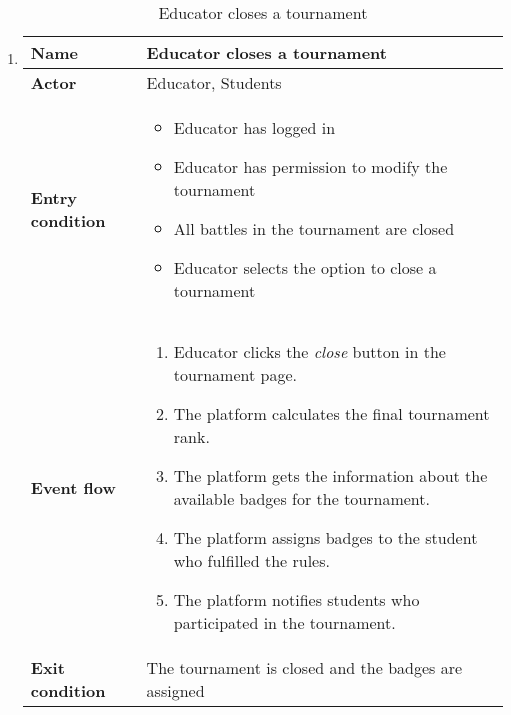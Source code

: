 \begin{enumerate}[label=\textbf{UC\arabic*}:,leftmargin=1.3cm]
      \item \textbf{}
            \begin{table}[H]
                  \centering
                  \begin{tabular}{|l|p{11.9cm}|}
                        \hline
                        \textbf{Name}            & Educator closes a tournament                               \\\hline
                        \textbf{Actor}           & Educator, Students                                         \\\hline
                        \textbf{Entry condition} &
                        \begin{itemize}
                              \item Educator has logged in
                              \item Educator has permission to modify the tournament
                              \item All battles in the tournament are closed
                              \item Educator selects the option to close a tournament
                        \end{itemize}                                \\\hline
                        \textbf{Event flow}      &
                        \begin{enumerate}[label=\arabic*.]
                              \item Educator clicks the \emph{close} button in the tournament page.
                              \item The platform calculates the final tournament rank.
                              \item The platform gets the information about the available badges for the tournament.
                              \item The platform assigns badges to the student who fulfilled the rules.
                              \item The platform notifies students who participated in the tournament.
                        \end{enumerate} \\\hline
                        \textbf{Exit condition}  & The tournament is closed and the badges are assigned       \\\hline
                  \end{tabular}
                  \caption{Educator closes a tournament   }
                  \label{table:Educator closes a tournament   }
            \end{table}


\end{enumerate}
